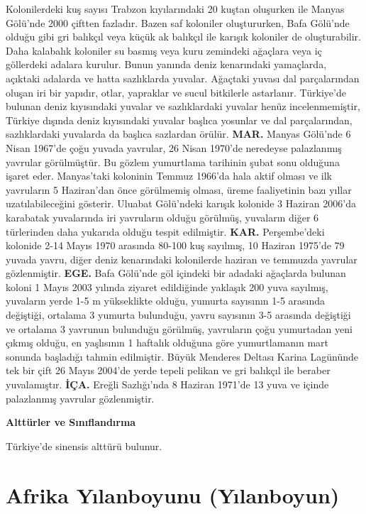 \documentclass[
  letterpaper,
  DIV=11,
  numbers=noendperiod]{scrreprt}
\begin{document}
Kolonilerdeki kuş sayısı Trabzon kıyılarındaki 20 kuştan oluşurken ile
Manyas Gölü'nde 2000 çiftten fazladır. Bazen saf koloniler oluştururken,
Bafa Gölü'nde olduğu gibi gri balıkçıl veya küçük ak balıkçıl ile
karışık koloniler de oluşturabilir. Daha kalabalık koloniler su basmış
veya kuru zemindeki ağaçlara veya iç göllerdeki adalara kurulur. Bunun
yanında deniz kenarındaki yamaçlarda, açıktaki adalarda ve hatta
sazlıklarda yuvalar. Ağaçtaki yuvası dal parçalarından oluşan iri bir
yapıdır, otlar, yapraklar ve sucul bitkilerle astarlanır. Türkiye'de
bulunan deniz kıyısındaki yuvalar ve sazlıklardaki yuvalar henüz
incelenmemiştir, Türkiye dışında deniz kıyısındaki yuvalar başlıca
yosunlar ve dal parçalarından, sazlıklardaki yuvalarda da başlıca
sazlardan örülür. \textbf{MAR.} Manyas Gölü'nde 6 Nisan 1967'de çoğu
yuvada yavrular, 26 Nisan 1970'de neredeyse palazlanmış yavrular
görülmüştür. Bu gözlem yumurtlama tarihinin şubat sonu olduğuna işaret
eder. Manyas'taki koloninin Temmuz 1966'da hala aktif olması ve ilk
yavruların 5 Haziran'dan önce görülmemiş olması, üreme faaliyetinin bazı
yıllar uzatılabileceğini gösterir. Uluabat Gölü'ndeki karışık kolonide 3
Haziran 2006'da karabatak yuvalarında iri yavruların olduğu görülmüş,
yuvaların diğer 6 türlerinden daha yukarıda olduğu tespit edilmiştir.
\textbf{KAR.} Perşembe'deki kolonide 2-14 Mayıs 1970 arasında 80-100 kuş
sayılmış, 10 Haziran 1975'de 79 yuvada yavru, diğer deniz kenarındaki
kolonilerde haziran ve temmuzda yavrular gözlenmiştir. \textbf{EGE.}
Bafa Gölü'nde göl içindeki bir adadaki ağaçlarda bulunan koloni 1 Mayıs
2003 yılında ziyaret edildiğinde yaklaşık 200 yuva sayılmış, yuvaların
yerde 1-5 m yükseklikte olduğu, yumurta sayısının 1-5 arasında
değiştiği, ortalama 3 yumurta bulunduğu, yavru sayısının 3-5 arasında
değiştiği ve ortalama 3 yavrunun bulunduğu görülmüş, yavruların çoğu
yumurtadan yeni çıkmış olduğu, en yaşlısının 1 haftalık olduğuna göre
yumurtlamanın mart sonunda başladığı tahmin edilmiştir. Büyük Menderes
Deltası Karina Lagününde tek bir çift 26 Mayıs 2004'de yerde tepeli
pelikan ve gri balıkçıl ile beraber yuvalamıştır. \textbf{İÇA.} Ereğli
Sazlığı'nda 8 Haziran 1971'de 13 yuva ve içinde palazlanmış yavrular
gözlenmiştir.

\textbf{Alttürler ve Sınıflandırma}

Türkiye'de sinensis alttürü bulunur.

\section{Afrika Yılanboyunu
(Yılanboyun)}\label{afrika-yux131lanboyunu-yux131lanboyun}
\end{document}
